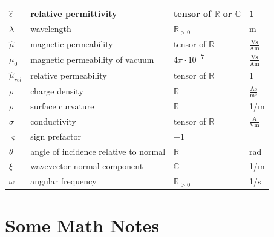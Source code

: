 \documentclass[12pt,a4paper,twoside,openright,BCOR10mm,headsepline,titlepage,abstracton,chapterprefix,final]{scrreprt}
\newcommand\vacuum{0}
\newcommand\Tensor[1]{\hat{#1}}
\newcommand\permeability{\Tensor{\scalarpermeability}}
\newcommand\vacuumpermeability{\scalarpermeability_{\vacuum}}
\newcommand\scalarpermeability{\mu}
\newcommand\relativepermeability{\Tensor{\mu}_{rel}}
\newcommand\scalarrelativepermittivity{\epsilon}
\newcommand\relativepermittivity{\Tensor{\scalarrelativepermittivity}}
\newcommand\conductivity{\Tensor{\sigma}}
\newcommand\chargedensity{\rho}
\newcommand\meter{\textrm{m}}
\newcommand\second{\textrm{s}}
\newcommand\ampere{\textrm{A}}
\newcommand\volt{\textrm{V}}
\begin{document}
\begin{tabular}{l|l|l|l}
 $\relativepermittivity$ & relative permittivity & tensor of $\mathbb{R}$ or $\mathbb{C}$ & 1\\
 \hline
 $\lambda$ & wavelength & $\mathbb{R}_{>0}$ & \meter \\
 \hline
 $\permeability$ & magnetic permeability & tensor of $\mathbb{R}$ & $\frac{\volt \second}{\ampere \meter}$ \\
 $\vacuumpermeability$ & magnetic permeability of vacuum & $4\pi \cdot 10^{-7}$ & $\frac{\volt \second}{\ampere \meter}$ \\
 $\relativepermeability$ & relative permeability & tensor of $\mathbb{R}$ & 1\\
 \hline
 $\chargedensity$ & charge density & $\mathbb{R}$ & $\frac{\ampere \second}{\meter^3}$ \\
 $\rho$ & surface curvature & $\mathbb{R}$ & 1/\meter \\
 \hline
 $\conductivity$ & conductivity & tensor of $\mathbb{R}$ & $\frac{\ampere}{\volt\meter}$\\
 \hline
 $\varsigma$ & sign prefactor & $\pm 1$ & \\
 \hline
 $\theta$ & angle of incidence relative to normal & $\mathbb{R}$ & rad \\
 \hline
 $\xi$ & wavevector normal component & $\mathbb{C}$ & 1/\meter \\
 \hline
 $\omega$ & angular frequency & $\mathbb{R}_{>0}$ & 1/\second
\end{tabular}

\chapter{Some Math Notes}
\end{document}

